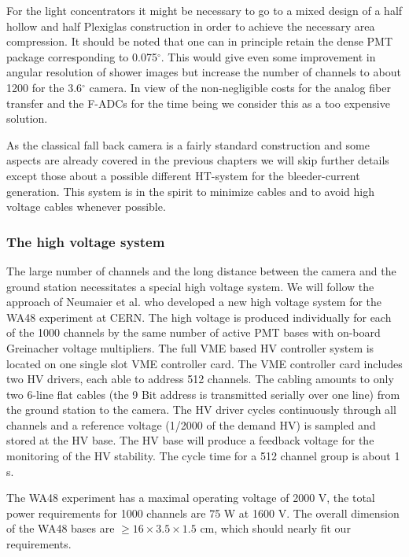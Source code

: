 For the light concentrators it might be necessary to go to a mixed design of a
half hollow and half Plexiglas construction in order to achieve the
necessary area compression. It should be noted that one can in principle
retain the dense PMT package corresponding to 0.075$^{\circ }$. This would
give even some improvement in angular resolution of shower images but
increase the number of channels to about 1200 for the 3.6$^{\circ }$ camera.
In view of the non-negligible costs for the analog fiber transfer and the
F-ADCs for the time being we consider this as a too expensive solution.

As the classical fall back camera is a fairly standard construction and some
aspects are already covered in the previous chapters we will skip further
details except those about a possible different HT-system for the
bleeder-current generation. This system is in the spirit to minimize cables
and to avoid high voltage cables whenever possible.

\subsubsection{The high voltage system}


\medskip The large number of channels and the long distance between the
camera and the ground station necessitates a special high voltage system. We
will follow the approach of Neumaier et al. \cite{neumaier:95} who developed a
new high voltage system for the WA48 experiment at CERN. The high voltage is
produced individually for each of the 1000 channels by the same number of
active PMT bases with on-board Greinacher voltage multipliers. The full
VME based HV controller system is located on one single slot VME controller
card. The VME controller card includes two HV drivers, each able to address
512 channels. The cabling amounts to only two 6-line flat cables (the 9 Bit
address is transmitted serially over one line) from the ground station to
the camera. The HV driver cycles continuously through all channels and a
reference voltage (1/2000 of the demand HV) is sampled and stored at the HV
base. The HV base will produce a feedback voltage for the monitoring of the
HV stability. The cycle time for a 512 channel group is about 1 s.

The WA48 experiment has a maximal operating voltage of 2000 V, the total
power requirements for 1000 channels are 75 W at 1600 V. The overall
dimension of the WA48 bases are $\geq 16\times 3.5\times 1.5$ cm, which
should nearly fit our requirements.

